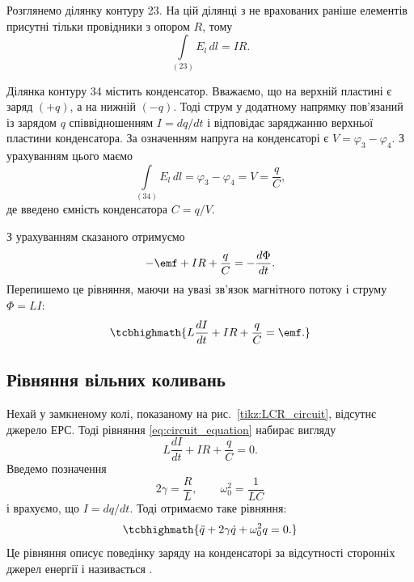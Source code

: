 Розглянемо ділянку контуру 23. На цій ділянці з не врахованих
раніше елементів присутні тільки провідники з опором $R$, тому
\begin{equation}\label{eq:IR}
	\int\limits_{(23)} E_l \, dl = IR.
\end{equation}

Ділянка контуру 34 містить конденсатор. Вважаємо, що на верхній
пластині є заряд $(+q)$, а на нижній $(-q)$. Тоді струм у додатному
напрямку пов'язаний із зарядом $q$ співвідношенням $I = dq/dt$ і
відповідає заряджанню верхньої пластини конденсатора. За означенням
напруга на конденсаторі є $V = \varphi_3 - \varphi_4$. З урахуванням цього маємо
\begin{equation}\label{eq:capacitor_voltage}
	\int\limits_{(34)} E_l \, dl = \varphi_3 - \varphi_4 = V = \frac{q}{C},
\end{equation}
де введено ємність конденсатора $C = q/V$.

З урахуванням сказаного отримуємо
\begin{equation}\label{eq:circuit_equation_raw}
	-\emf + IR + \frac{q}{C} = -\frac{d\Phi}{dt}.
\end{equation}
Перепишемо це рівняння, маючи на увазі зв'язок магнітного потоку і струму
$\Phi = LI$:
\begin{equation}\label{eq:circuit_equation}
	\tcbhighmath{
		L\frac{dI}{dt} + IR + \frac{q}{C} = \emf.
	}
\end{equation}

\subsection*{Рівняння вільних коливань}

Нехай у замкненому колі, показаному на рис.~\ref{tikz:LCR_circuit}, відсутнє
джерело ЕРС. Тоді рівняння \eqref{eq:circuit_equation} набирає вигляду
\begin{equation}\label{eq:free_oscillation_raw}
	L\frac{dI}{dt} + IR + \frac{q}{C} = 0.
\end{equation}
Введемо позначення
\begin{equation}\label{eq:definitions}
	2\gamma = \frac{R}{L}, \qquad \omega_0^2 = \frac{1}{LC}
\end{equation}
і врахуємо, що $I = dq/dt$. Тоді отримаємо таке рівняння:
\begin{equation}\label{eq:free_oscillation}
	\tcbhighmath{
		\ddot{q} + 2\gamma\dot{q} + \omega_0^2 q = 0.
	}
\end{equation}
Це рівняння описує поведінку заряду на конденсаторі за
відсутності сторонніх джерел енергії і називається .

